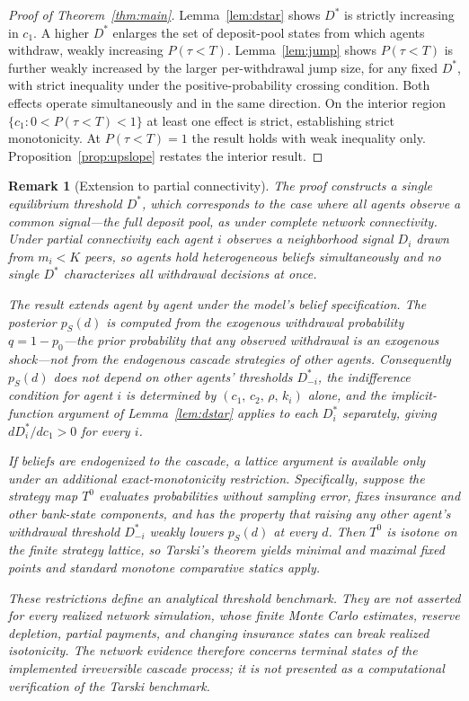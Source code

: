 \documentclass[12pt]{article}\usepackage[]{graphicx}\usepackage[]{xcolor}
\newtheorem{remark}{Remark}
\begin{document}
\begin{proof}[Proof of Theorem~\ref{thm:main}]
Lemma~\ref{lem:dstar} shows $D^*$ is strictly increasing in $c_1$.
A higher $D^*$ enlarges the set of deposit-pool states from which agents withdraw, weakly increasing $P(\tau < T)$.
Lemma~\ref{lem:jump} shows $P(\tau < T)$ is further weakly increased by the larger per-withdrawal jump size, for any fixed $D^*$, with strict inequality under the positive-probability crossing condition.
Both effects operate simultaneously and in the same direction.
On the interior region $\{c_1 : 0 < P(\tau < T) < 1\}$ at least one effect is strict, establishing strict monotonicity.
At $P(\tau < T) = 1$ the result holds with weak inequality only.
Proposition~\ref{prop:upslope} restates the interior result.
\end{proof}

\begin{remark}[Extension to partial connectivity]
\label{rem:partialconn}
The proof constructs a single equilibrium threshold $D^*$, which corresponds to the case where all agents observe a common signal---the full deposit pool, as under complete network connectivity.
Under partial connectivity each agent $i$ observes a neighborhood signal $D_i$ drawn from $m_i < K$ peers, so agents hold heterogeneous beliefs simultaneously and no single $D^*$ characterizes all withdrawal decisions at once.

The result extends agent by agent under the model's belief specification.
The posterior $p_S(d)$ is computed from the exogenous withdrawal probability $q = 1 - p_0$---the prior probability that any observed withdrawal is an exogenous shock---not from the endogenous cascade strategies of other agents.
Consequently $p_S(d)$ does not depend on other agents' thresholds $D^*_{-i}$, the indifference condition for agent $i$ is determined by $(c_1,\, c_2,\, \rho,\, k_i)$ alone, and the implicit-function argument of Lemma~\ref{lem:dstar} applies to each $D^*_i$ separately, giving $dD^*_i/dc_1 > 0$ for every $i$.

If beliefs are endogenized to the cascade, a lattice argument is available only under an additional exact-monotonicity restriction.
Specifically, suppose the strategy map $T^0$ evaluates probabilities without sampling error, fixes insurance and other bank-state components, and has the property that raising any other agent's withdrawal threshold $D^*_{-i}$ weakly lowers $p_S(d)$ at every $d$.
Then $T^0$ is isotone on the finite strategy lattice, so Tarski's theorem yields minimal and maximal fixed points and standard monotone comparative statics apply.

These restrictions define an analytical threshold benchmark.
They are not asserted for every realized network simulation, whose finite Monte Carlo estimates, reserve depletion, partial payments, and changing insurance states can break realized isotonicity.
The network evidence therefore concerns terminal states of the implemented irreversible cascade process; it is not presented as a computational verification of the Tarski benchmark.
\end{remark}
\end{document}
